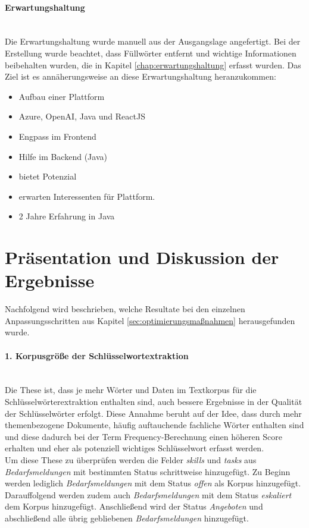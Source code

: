 \paragraph{Erwartungshaltung}\mbox{}\\
Die Erwartungshaltung wurde manuell aus der Ausgangslage angefertigt. Bei der Erstellung wurde beachtet, dass Füllwörter entfernt und wichtige Informationen beibehalten wurden, die in Kapitel \ref{chap:erwartungshaltung} erfasst wurden. Das Ziel ist es annäherungsweise an diese Erwartungshaltung heranzukommen:
\begin{itemize}
	\item Aufbau einer Plattform
	\item Azure, OpenAI, Java und ReactJS
	\item Engpass im Frontend
	\item Hilfe im Backend (Java)
	\item bietet Potenzial
	\item erwarten Interessenten für Plattform.
	\item 2 Jahre Erfahrung in Java
\end{itemize}
\section{Präsentation und Diskussion der Ergebnisse}
Nachfolgend wird beschrieben, welche Resultate bei den einzelnen Anpassungsschritten aus Kapitel \ref{sec:optimierungsmaßnahmen} herausgefunden wurde.
\paragraph{1. Korpusgröße der Schlüsselwortextraktion}\mbox{}\\
Die These ist, dass je mehr Wörter und Daten im Textkorpus für die Schlüsselwörterextraktion enthalten sind, auch bessere Ergebnisse in der Qualität der Schlüsselwörter erfolgt. Diese Annahme beruht auf der Idee, dass durch mehr themenbezogene Dokumente, häufig auftauchende fachliche Wörter enthalten sind und diese dadurch bei der Term Frequency-Berechnung einen höheren Score erhalten und eher als potenziell wichtiges Schlüsselwort erfasst werden.\\

Um diese These zu überprüfen werden die Felder \emph{skills} und \emph{tasks} aus \emph{Bedarfsmeldungen} mit bestimmten Status schrittweise hinzugefügt. Zu Beginn werden lediglich \emph{Bedarfsmeldungen} mit dem Status \emph{offen} als Korpus hinzugefügt. Darauffolgend werden zudem auch \emph{Bedarfsmeldungen} mit dem Status \emph{eskaliert} dem Korpus hinzugefügt. Anschließend wird der Status \emph{Angeboten} und abschließend alle übrig gebliebenen \emph{Bedarfsmeldungen} hinzugefügt.



